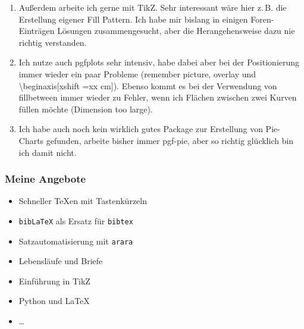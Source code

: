 \documentclass[ngerman]{beamer}
\newcommand{\bb}{\textasteriskcentered\textasteriskcentered}
\newcommand{\cc}{\textasteriskcentered\textasteriskcentered\textasteriskcentered}
\begin{document}
\begin{frame}[allowframebreaks]
\begin{enumerate}
\item 
Außerdem arbeite ich gerne mit TikZ. Sehr interessant wäre hier z.\,B. die Erstellung eigener Fill Pattern. Ich habe mir bislang in einigen Foren-Einträgen Lösungen zusammengesucht, aber die Herangehensweise dazu nie richtig verstanden. \cc

\item Ich nutze auch pgfplots sehr intensiv, habe dabei aber bei der Positionierung immer wieder ein paar Probleme (remember picture, overlay und \textbackslash  begin{axis}[xshift =xx cm]).
Ebenso kommt es bei der Verwendung von fillbetween immer wieder zu Fehler, wenn ich Flächen zwischen zwei Kurven füllen möchte (Dimension too large). \cc

\item 
Ich habe auch noch kein wirklich gutes Package zur Erstellung von Pie-Charts gefunden, arbeite bisher immer pgf-pie, aber so richtig glücklich bin ich damit nicht. \bb

\end{enumerate}
\end{frame}

\begin{frame}
\frametitle{Meine Angebote}

\begin{itemize}
\item Schneller TeXen mit Tastenkürzeln
\item \texttt{bibLaTeX} als Ersatz für \texttt{bibtex}
\item Satzautomatisierung mit \texttt{arara}
\item Lebensläufe und Briefe
\item Einführung in TikZ
\item Python und LaTeX
\item \ldots
\end{itemize}
\end{frame}
\end{document}
